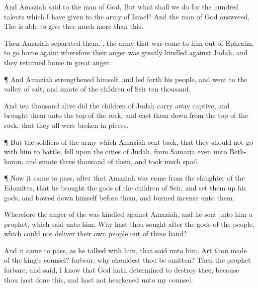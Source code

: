 {And
Amaziah
said to the
man of
God, But what shall we
do for the
hundred
talents which I have
given to the
army of
Israel? And the
man of
God
answered, The
{}
is able to
give thee much
more than this.

Then
Amaziah
separated them,
{}, the
army that was
come to him out of
Ephraim, to
go
home
again: wherefore their
anger was
greatly
kindled against
Judah, and they
returned
home in
great
anger.


\par }{\PP {}¶ And
Amaziah
strengthened himself, and led
forth his
people, and
went to the
valley of
salt, and
smote of the
children of
Seir
ten
thousand.

And
{}
ten
thousand
{}
alive did the
children of
Judah carry away
captive, and
brought them unto the
top of the
rock, and cast them
down from the
top of the
rock, that they all were broken in
pieces.


\par }{\PP {}¶ But the
soldiers of the
army which
Amaziah sent
back, that they should not
go with him to
battle,
fell upon the
cities of
Judah, from
Samaria even unto
Beth-horon, and
smote
three
thousand of them, and
took
much
spoil.


\par }{\PP {}¶ Now it came to pass,
after that
Amaziah was
come from the
slaughter of the
Edomites, that he
brought the
gods of the
children of
Seir, and set them
up
{} his
gods, and bowed
down himself
before them, and burned
incense unto them.

Wherefore the
anger of the
{} was
kindled against
Amaziah, and he
sent unto him a
prophet, which
said unto him, Why hast thou
sought after the
gods of the
people, which could not
deliver their own
people out of thine
hand?

And it came to pass, as he
talked with him, that
{}
said unto him, Art thou
made of the
king’s
counsel?
forbear; why shouldest thou be
smitten? Then the
prophet
forbare, and
said, I
know that
God hath
determined to
destroy thee, because thou hast
done this, and hast not
hearkened unto my
counsel.


}
